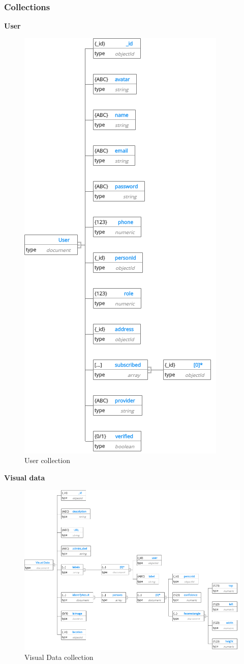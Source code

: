 \subsubsection{Collections}
\textbf{User}
\begin{center}
	\begin{figure}[H]
		\centering
		\includegraphics[width=0.5\columnwidth]{images/chap4/User.png}
		\caption{User collection}
	\end{figure}
\end{center}
\cleardoublepage
\textbf{Visual data}
\begin{center}
	\begin{figure}[H]
		\centering
		\includegraphics[width=1\columnwidth]{images/chap4/Visual.png}
		\caption{Visual Data collection}
	\end{figure}
\end{center}
